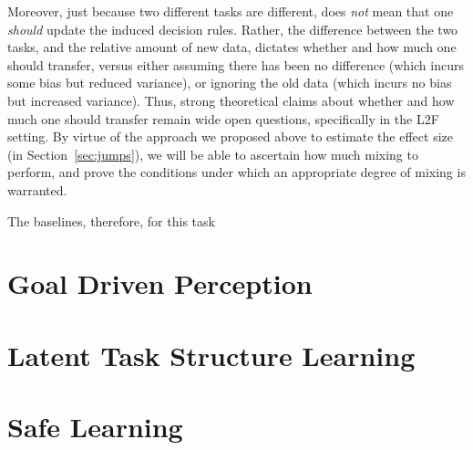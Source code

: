 \documentclass{article}
\begin{document}
Moreover, just because two different tasks are different, does \emph{not} mean that one \emph{should} update the induced decision rules.  Rather, the difference between the two tasks, and the relative amount of new data, dictates whether and how much one should transfer, versus either assuming there has been no difference (which incurs some bias but reduced variance), or ignoring the old data (which incurs no bias but increased variance).  Thus, strong theoretical claims about whether and how much one should transfer remain wide open questions, specifically in the L2F setting.  By virtue of the approach we proposed above to estimate the effect size (in Section~\ref{sec:jumps}), we will be able to ascertain how much mixing to perform, and prove the conditions under which an appropriate degree of mixing is warranted. 

The baselines, therefore, for this task 


\section{Goal Driven Perception}

\section{Latent Task Structure Learning}

\section{Safe Learning}
\end{document}
